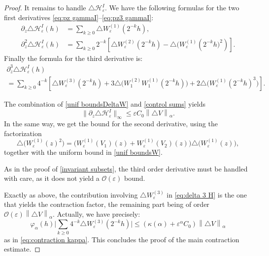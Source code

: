\documentclass[JEP,XML,SOM,Unicode]{cedram}
\let\mathcal\mathscr
\newcommand{\cO}{\mathcal{O}}
\theoremstyle{plain}
\theoremstyle{definition}
\renewcommand{\H}{\mathcal{H}_\eps}
\let\eps\varepsilon
\let\ds\displaystyle
\newcommand{\bbabs}[1]{\biggl\lvert#1\biggr\rvert}
\newcommand{\nalph}[1]{\left\lVert#1\right\rVert_\alpha}
\newcommand{\vphia}{\varphi_\alpha}
\begin{document}
\begin{proof}
It remains to handle $\triangle \H^I$. We have the following formulas for the two first derivatives \eqref{eq:pz gammaI}--\eqref{eq:pz3 gammaI}:\vspace*{-3pt}
\begin{align*}
\partial_z \triangle \H^I (h) & = \sum_{k \geq 0} \triangle W_\eps^{(1)}(2^{-k}h), \\
\partial^2_z \triangle \H^I(h) & = \sum_{k\geq 0} 2^{-k} \left[\triangle W_\eps^{(2)}(2^{-k}h)-\triangle \bigl(W_\eps^{(1)}(2^{-k}h\bigr)^2) \right].
\end{align*}
Finally the formula for the third derivative is:\vspace*{-3pt}
\begin{multline}\label{eq:delta 3 H}
\ds \partial^3_z \triangle \H^I(h)\\
= \ds \sum_{k \geq 0} 4^{-k} \left[\triangle W_\eps^{(3)}(2^{-k}h)+3 \triangle \bigl (W_1^{(2)}W_1^{(1)}(2^{-k}h) \bigr) +2 \triangle \bigl (W_\eps^{(1)}(2^{-k}h)^3 \bigr) \right].	
\end{multline}

The combination of \cref{unif boundsDeltaW} and \cref{control sums} yields
\begin{equation*}
\|\partial_z \triangle \H^I\|_{\infty} \leq \eps C_0 \nalph{\triangle V}.
\end{equation*}
In the same way, we get the bound for the second derivative, using the factorization
\begin{equation*}
\triangle \bigl (W_\eps^{(1)}(z)^2 \bigr) = \bigl (W_\eps^{(1)}(V_1)(z) + W_\eps^{(1)}(V_2)(z) \bigr) \triangle \bigl (W_\eps^{(1)}(z) \bigr),
\end{equation*}
together with the uniform bound in \cref{unif boundsW}.

As in the proof of \cref{invariant subsets}, the third order derivative must be handled with care, as it does not yield a $\cO(\eps)$ bound.

Exactly as above, the contribution involving $\triangle W_\eps^{(3)}$ in \eqref{eq:delta 3 H} is the one that yields the contraction factor, the remaining part being of order $\cO(\eps) \nalph{\triangle V}$. Actually, we have precisely:
\begin{equation*}
\vphia(h) \ds \bbabs{ \sum_{k\geq 0} 4^{-k} \triangle W_\eps^{(3)} (2^{-k}h)} \leq \left(\kappa(\alpha) + \eps^\alpha C_0 \right) \nalph{\triangle V}
\end{equation*}
as in \eqref{eq:contraction kappa}. This concludes the proof of the main contraction estimate.
\end{proof}
\end{document}
